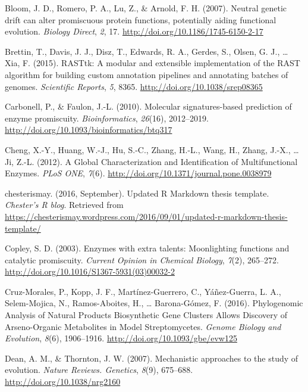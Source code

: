 \documentclass[12pt,twoside]{reedthesis}
\begin{document}
  \hypertarget{ref-bloomux5fneutralux5f2007}{}
  Bloom, J. D., Romero, P. A., Lu, Z., \& Arnold, F. H. (2007). Neutral
  genetic drift can alter promiscuous protein functions, potentially
  aiding functional evolution. \emph{Biology Direct}, \emph{2}, 17.
  \url{http://doi.org/10.1186/1745-6150-2-17}
  
  \hypertarget{ref-brettinux5frasttk:ux5f2015}{}
  Brettin, T., Davis, J. J., Disz, T., Edwards, R. A., Gerdes, S., Olsen,
  G. J., \ldots{} Xia, F. (2015). RASTtk: A modular and extensible
  implementation of the RAST algorithm for building custom annotation
  pipelines and annotating batches of genomes. \emph{Scientific Reports},
  \emph{5}, 8365. \url{http://doi.org/10.1038/srep08365}
  
  \hypertarget{ref-carbonellux5fmolecularux5f2010}{}
  Carbonell, P., \& Faulon, J.-L. (2010). Molecular signatures-based
  prediction of enzyme promiscuity. \emph{Bioinformatics}, \emph{26}(16),
  2012--2019. \url{http://doi.org/10.1093/bioinformatics/btq317}
  
  \hypertarget{ref-chengux5fglobalux5f2012}{}
  Cheng, X.-Y., Huang, W.-J., Hu, S.-C., Zhang, H.-L., Wang, H., Zhang,
  J.-X., \ldots{} Ji, Z.-L. (2012). A Global Characterization and
  Identification of Multifunctional Enzymes. \emph{PLoS ONE}, \emph{7}(6).
  \url{http://doi.org/10.1371/journal.pone.0038979}
  
  \hypertarget{ref-chesterismayux5fupdatedux5f2016}{}
  chesterismay. (2016, September). Updated R Markdown thesis template.
  \emph{Chester's R blog}. Retrieved from
  \url{https://chesterismay.wordpress.com/2016/09/01/updated-r-markdown-thesis-template/}
  
  \hypertarget{ref-copleyux5fenzymesux5f2003}{}
  Copley, S. D. (2003). Enzymes with extra talents: Moonlighting functions
  and catalytic promiscuity. \emph{Current Opinion in Chemical Biology},
  \emph{7}(2), 265--272.
  \url{http://doi.org/10.1016/S1367-5931(03)00032-2}
  
  \hypertarget{ref-cruz-moralesux5fphylogenomicux5f2016}{}
  Cruz-Morales, P., Kopp, J. F., Martínez-Guerrero, C., Yáñez-Guerra, L.
  A., Selem-Mojica, N., Ramos-Aboites, H., \ldots{} Barona-Gómez, F.
  (2016). Phylogenomic Analysis of Natural Products Biosynthetic Gene
  Clusters Allows Discovery of Arseno-Organic Metabolites in Model
  Streptomycetes. \emph{Genome Biology and Evolution}, \emph{8}(6),
  1906--1916. \url{http://doi.org/10.1093/gbe/evw125}
  
  \hypertarget{ref-deanux5fmechanisticux5f2007}{}
  Dean, A. M., \& Thornton, J. W. (2007). Mechanistic approaches to the
  study of evolution. \emph{Nature Reviews. Genetics}, \emph{8}(9),
  675--688. \url{http://doi.org/10.1038/nrg2160}
  
\end{document}

